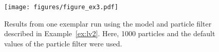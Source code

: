 \begin{landscape}
  \begin{figure}
    \centering
    \texttt{[image: figures/figure\_ex3.pdf]}
    \caption{Results from one exemplar run using the model and
      particle filter described in Example~\ref{ex:lv2}. Here, 1000
      particles and the default values of the particle filter were
      used.}%
    \label{fig:ex3}
  \end{figure}
\end{landscape}


 
